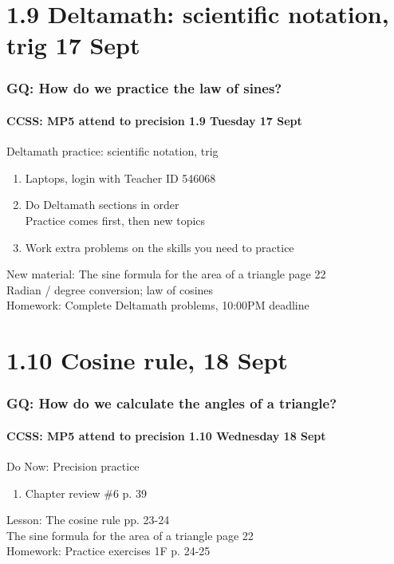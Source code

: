 \documentclass{beamer}
\begin{document}
  \section{1.9 Deltamath: scientific notation, trig 17 Sept}
  \frame
  {
    \frametitle{GQ: How do we practice the law of sines?}
    \framesubtitle{CCSS: MP5 attend to precision \hfill \alert{1.9 Tuesday 17 Sept}}

    \begin{block}{Deltamath practice: scientific notation, trig}
      \begin{enumerate}
        \item Laptops, login with Teacher ID \alert{546068}
        \item Do Deltamath sections in order \\
        Practice comes first, then new topics
        \item Work extra problems on the skills you need to practice
    \end{enumerate}
    \end{block}
    New material: The sine formula for the area of a triangle page 22\\
    Radian / degree conversion; law of cosines\\ \smallskip
    Homework: Complete Deltamath problems, 10:00PM deadline
  }

  \section{1.10 Cosine rule, 18 Sept}
  \frame
  {
    \frametitle{GQ: How do we calculate the angles of a triangle?}
    \framesubtitle{CCSS: MP5 attend to precision \hfill \alert{1.10 Wednesday 18 Sept}}

    \begin{block}{Do Now: Precision practice}
    \begin{enumerate}
        \item Chapter review \#6 p. 39
    \end{enumerate}
    \end{block}
    Lesson: The cosine rule pp. 23-24\\
    The sine formula for the area of a triangle page 22\\ \smallskip
    Homework: Practice exercises 1F p. 24-25
  }
\end{document}
